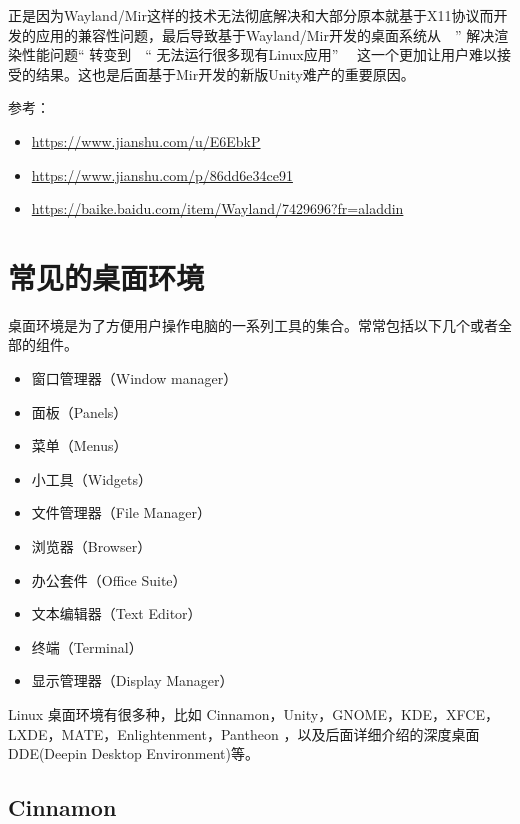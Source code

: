 \documentclass[doctor,openright,twoside]{sjtuthesis}
\providecommand{\tightlist}{%
    \setlength{\itemsep}{0pt}\setlength{\parskip}{0pt}}
\theoremstyle{plain}
\theoremstyle{definition}
\theoremstyle{remark}
\theoremstyle{ocrenumbox}
\theoremstyle{plain}
\begin{document}
正是因为Wayland/Mir这样的技术无法彻底解决和大部分原本就基于X11协议而开发的应用的兼容性问题，最后导致基于Wayland/Mir开发的桌面系统从　'' 解决渲染性能问题`` 转变到　`` 无法运行很多现有Linux应用'' 　这一个更加让用户难以接受的结果。这也是后面基于Mir开发的新版Unity难产的重要原因。

参考：

\begin{itemize}
\tightlist
\item
  \url{https://www.jianshu.com/u/E6EbkP}
\item
  \url{https://www.jianshu.com/p/86dd6e34ce91}
\item
  \url{https://baike.baidu.com/item/Wayland/7429696?fr=aladdin}
\end{itemize}

\hypertarget{section-12}{%
\section{常见的桌面环境}\label{section-12}}

桌面环境是为了方便用户操作电脑的一系列工具的集合。常常包括以下几个或者全部的组件。

\begin{itemize}
\tightlist
\item
  窗口管理器（Window manager）
\item
  面板（Panels）
\item
  菜单（Menus）
\item
  小工具（Widgets）
\item
  文件管理器（File Manager）
\item
  浏览器（Browser）
\item
  办公套件（Office Suite）
\item
  文本编辑器（Text Editor）
\item
  终端（Terminal）
\item
  显示管理器（Display Manager）
\end{itemize}

Linux 桌面环境有很多种，比如
Cinnamon，Unity，GNOME，KDE，XFCE，LXDE，MATE，Enlightenment，Pantheon
，以及后面详细介绍的深度桌面 DDE(Deepin Desktop Environment)等。

\hypertarget{cinnamon}{%
\subsection{Cinnamon}\label{cinnamon}}
\end{document}

